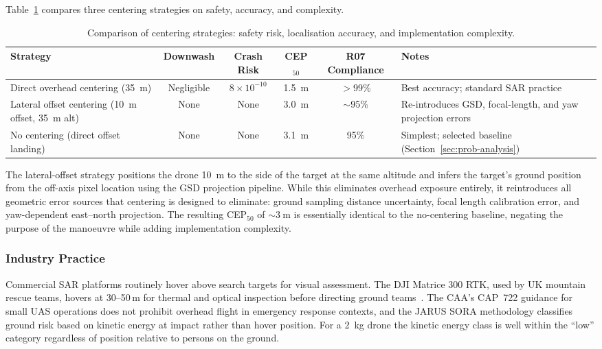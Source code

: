 Table~\ref{tab:hover-safety} compares three centering strategies on safety, accuracy, and complexity.

\begin{table}[ht]
\centering
\caption{Comparison of centering strategies: safety risk, localisation accuracy, and implementation complexity.}
\label{tab:hover-safety}
\begin{tabular}{p{3.2cm}ccccp{3.8cm}}
\toprule
\textbf{Strategy} & \textbf{Downwash} & \textbf{Crash Risk} & \textbf{CEP$_{50}$} & \textbf{R07 Compliance} & \textbf{Notes} \\
\midrule
Direct overhead centering (\SI{35}{\metre})
    & Negligible & $8\times10^{-10}$ & \SI{1.5}{\metre} & $>$99\% & Best accuracy; standard SAR practice \\
\addlinespace
Lateral offset centering (\SI{10}{\metre} offset, \SI{35}{\metre} alt)
    & None & None & \SI{3.0}{\metre} & ${\sim}$95\% & Re-introduces GSD, focal-length, and yaw projection errors \\
\addlinespace
No centering (direct offset landing)
    & None & None & \SI{3.1}{\metre} & 95\% & Simplest; selected baseline (Section~\ref{sec:prob-analysis}) \\
\bottomrule
\end{tabular}
\end{table}

\noindent The lateral-offset strategy positions the drone \SI{10}{\metre} to the side of the target at the same altitude and infers the target's ground position from the off-axis pixel location using the GSD projection pipeline. While this eliminates overhead exposure entirely, it reintroduces all geometric error sources that centering is designed to eliminate: ground sampling distance uncertainty, focal length calibration error, and yaw-dependent east--north projection. The resulting CEP$_{50}$ of ${\sim}\SI{3}{\metre}$ is essentially identical to the no-centering baseline, negating the purpose of the manoeuvre while adding implementation complexity.

\subsubsection{Industry Practice}

Commercial SAR platforms routinely hover above search targets for visual assessment. The DJI Matrice 300 RTK, used by UK mountain rescue teams, hovers at 30--50\,m for thermal and optical inspection before directing ground teams~\cite{murphy2016disaster}. The CAA's CAP~722 guidance for small UAS operations does not prohibit overhead flight in emergency response contexts, and the JARUS SORA methodology classifies ground risk based on kinetic energy at impact rather than hover position. For a \SI{2}{\kilogram} drone the kinetic energy class is well within the ``low'' category regardless of position relative to persons on the ground.

